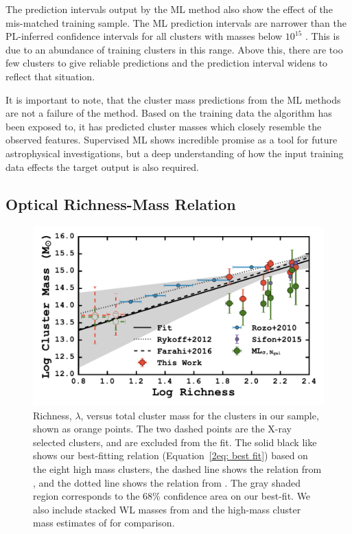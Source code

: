 The prediction intervals output by the ML method also show the effect of the mis-matched training sample. The ML prediction intervals are narrower than the PL-inferred confidence intervals for all clusters with masses below $10^{15}$ \Msol. This is due to an abundance of training clusters in this range. Above this, there are too few clusters to give reliable predictions and the prediction interval widens to reflect that situation.

It is important to note, that the cluster mass predictions from the ML methods are not a failure of the method. Based on the training data the algorithm has been exposed to, it has predicted cluster masses which closely resemble the observed features. Supervised ML shows incredible promise as a tool for future astrophysical investigations, but a deep understanding of how the input training data effects the target output is also required.

\subsection{Optical Richness-Mass Relation}
\begin{figure}[t]
	\begin{center}
		\includegraphics[width=\textwidth]{./figures2/massRichness.pdf} 
	\end{center}
	\caption[Richness versus total cluster mass for the clusters in our sample]{Richness, $\lambda$, versus total cluster mass for the clusters in our sample, shown as orange points. The two dashed points are the X-ray selected clusters, and are excluded from the fit. The solid black like shows our best-fitting relation (Equation~\protect\ref{2eq: best fit}) based on the eight high mass clusters, the dashed line shows the relation from \protect\cite{Farahi2016}, and the dotted line shows the relation from \protect\cite{Rykoff2012}. The gray shaded region corresponds to the 68\% confidence area on our best-fit. We also include stacked WL masses from \protect\cite{Rozo2010} and the high-mass cluster mass estimates of \protect\cite{Sifon2015} for comparison.}
\label{2fig:massRichness} 
\end{figure}

